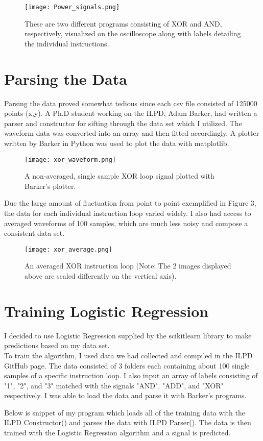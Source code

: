 \documentclass{article}
\newcommand\tab[1][1cm]{\hspace*{#1}}
\begin{document}
\begin{figure}
    \centering
    \texttt{[image: Power\_signals.png]}
    \caption{These are two different programs consisting of XOR and AND, respectively, visualized on the oscilloscope along with  labels detailing the individual instructions.}
    \label{fig:my_label}
\end{figure}


\section{Parsing the Data}

\tab Parsing the data proved somewhat tedious since each csv file consisted of 125000 points (x,y). A Ph.D student working on the ILPD, Adam Barker, had written a parser and constructor for sifting through the data set which I utilized. The waveform data was converted into an array and then fitted accordingly.  A plotter written by Barker in Python was used to plot the data with matplotlib.

    \begin{figure}[h]
        \centering
        \texttt{[image: xor\_waveform.png]}
        \caption{A non-averaged, single sample XOR loop signal plotted with Barker's plotter.}
        \label{fig:my_label}
    \end{figure}

\par Due the large amount of fluctuation from point to point exemplified in Figure 3, the data for each individual instruction loop varied widely. I also had access to averaged waveforms of 100 samples, which are much less noisy and compose a consistent data set. 

\begin{figure}[h]
        \centering
        \texttt{[image: xor\_average.png]}
        \caption{An averaged XOR instruction loop (Note: The 2 images displayed above are scaled differently on the vertical axis).}
        \label{fig:my_label}
    \end{figure}

\section{Training Logistic Regression}

I decided to use Logistic Regression supplied by the scikitlearn library to make predictions based on my data set. \\To train the algorithm, I used data we had collected and compiled in the ILPD GitHub page. The data consisted of 3 folders each containing about 100 single samples of a specific instruction loop. I also input an array of labels consisting of "1", "2", and "3" matched with the signals "AND", "ADD", and "XOR" respectively. I was able to load the data and parse it with Barker's programs. 
\\
\par Below is snippet of my program which loads all of the training data with the ILPD Constructor() and parses the data with ILPD Parser(). The data is then trained with the Logistic Regression algorithm and a signal is predicted.
\end{document}
